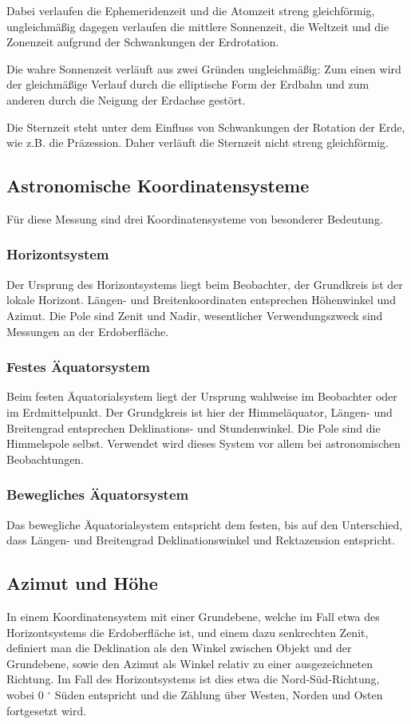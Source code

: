 Dabei verlaufen die Ephemeridenzeit und die Atomzeit streng gleichförmig, ungleichmäßig dagegen verlaufen die mittlere Sonnenzeit, die Weltzeit und die Zonenzeit aufgrund der Schwankungen der Erdrotation.

Die wahre Sonnenzeit verläuft aus zwei Gründen ungleichmäßig: Zum einen wird der gleichmäßige Verlauf durch die elliptische Form der Erdbahn und zum anderen durch die Neigung der Erdachse gestört.

Die Sternzeit steht unter dem Einfluss von Schwankungen der Rotation der Erde, wie z.B. die Präzession. Daher verläuft die Sternzeit nicht streng gleichförmig.

\subsection{Astronomische Koordinatensysteme}
Für diese Messung sind drei Koordinatensysteme von besonderer Bedeutung.

\subsubsection{Horizontsystem}

Der Ursprung des Horizontsystems liegt beim Beobachter, der Grundkreis ist der lokale Horizont. Längen- und Breitenkoordinaten entsprechen Höhenwinkel und Azimut. Die Pole sind Zenit und Nadir, wesentlicher Verwendungszweck sind Messungen an der Erdoberfläche. 

\subsubsection{Festes Äquatorsystem}

Beim festen Äquatorialsystem liegt der Ursprung wahlweise im Beobachter oder im Erdmittelpunkt. Der Grundgkreis ist hier der Himmeläquator, Längen- und Breitengrad entsprechen Deklinations- und Stundenwinkel. Die Pole sind die Himmelspole selbst. Verwendet wird dieses System vor allem bei astronomischen Beobachtungen. 

\subsubsection{Bewegliches Äquatorsystem}

Das bewegliche Äquatorialsystem entspricht dem festen, bis auf den Unterschied, dass Längen- und Breitengrad Deklinationswinkel und Rektazension entspricht. 

\subsection{Azimut und Höhe}
In einem Koordinatensystem mit einer Grundebene, welche im Fall etwa des Horizontsystems die Erdoberfläche ist, und einem dazu senkrechten Zenit, definiert man die Deklination als den Winkel zwischen Objekt und der Grundebene, sowie den Azimut als Winkel relativ zu einer ausgezeichneten Richtung. Im Fall des Horizontsystems ist dies etwa die Nord-Süd-Richtung, wobei 0 $^\circ$ Süden entspricht und die Zählung über Westen, Norden und Osten fortgesetzt wird.  

